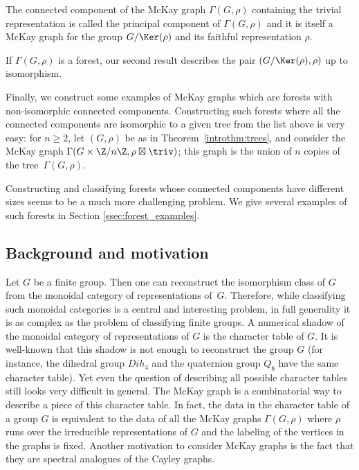 \begin{rema}\label{intrormk:principal_comp}
The connected component of the McKay graph $\Gamma(G,\rho)$ containing the trivial representation is called the principal component of $\Gamma(G,\rho)$ and it is itself a McKay graph for the group $G/\Ker(\rho)$ and its faithful representation $\rho$. 

If $\Gamma(G,\rho)$ is a forest, our second result describes the pair $(G/\Ker(\rho), \rho)$ up to isomorphism.
\end{rema}

{
Finally, we construct some examples of McKay graphs which are forests with non-isomorphic connected components. Constructing such forests where all the connected components are isomorphic to a given tree from the list above is very easy: for $n\geq 2$, let $(G, \rho)$ be as in Theorem~\ref{introthm:trees}, and consider the McKay graph $\Gamma(G\times \Z/n\Z, \rho \boxtimes \triv)$; this graph is the union of $n$ copies of the tree~$\Gamma(G, \rho)$. 

Constructing and classifying forests whose connected components have different sizes seems to be a much more challenging problem. We give several examples of such forests in Section \ref{ssec:forest_examples}.

}


\subsection{Background and motivation}
Let $G$ be a finite group. Then one can reconstruct the isomorphism class of $G$ from the monoidal category of representations of~$G$. Therefore, while classifying such monoidal categories is a central and interesting problem, in full generality it is as {complex} as the problem of classifying finite groups. A numerical shadow of the monoidal category of representations of $G$ is the character table of $G$. 
It is well-known that this shadow is not enough to reconstruct the group $G$ (for instance, the dihedral group $Dih_4$ and the quaternion group $Q_8$ have the same character table). Yet even the question of describing all {possible} character tables still looks very difficult in general. The McKay graph is a combinatorial way to describe a piece of this character table. In fact, the data in the character table of a group $G$ is equivalent to the data of all the McKay graphs $\Gamma(G, \rho)$ where $\rho$ runs over the irreducible representations of $G$ and the labeling of the vertices in the graphs is fixed.
Another motivation to consider McKay graphs is the fact that they are spectral analogues of the Cayley graphs.

